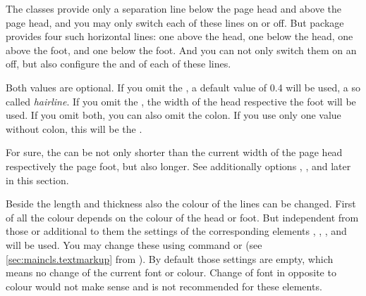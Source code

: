 \begin{Declaration}
\end{Declaration}
The \KOMAScript{} classes provide only a separation line below the page head
and above the page head, and you may only switch each of these lines on or
off. But package  provides four such horizontal
lines: one above the head, one below the head, one above the foot, and one
below the foot. And you can not only switch them on an off, but also configure
the  and  of each of these lines.

Both values are optional. If you omit the , a default value
of 0.4 will be used, a so called \emph{hairline}. If you omit the
, the width of the head respective the foot will be used. If you
omit both, you can also omit the colon. If you use only one value without
colon, this will be the .

For sure, the  can be not only shorter than the current width of
the page head respectively the page foot, but also longer. See additionally
options ,
, and
 later in this section.

%
%
%
%
Beside the length and thickness also the colour of the lines can be
changed. First of all the colour depends on the colour of the head or
foot. But independent from those or additional to them the settings of the
corresponding elements , ,
, and  will be used. You may
change these using command  or
 (see \autoref{sec:maincls.textmarkup}
from ). By default those settings
are empty, which means no change of the current font or colour. Change of font
in opposite to colour would not make sense and is not recommended for these
elements.%
%
%
%
%

